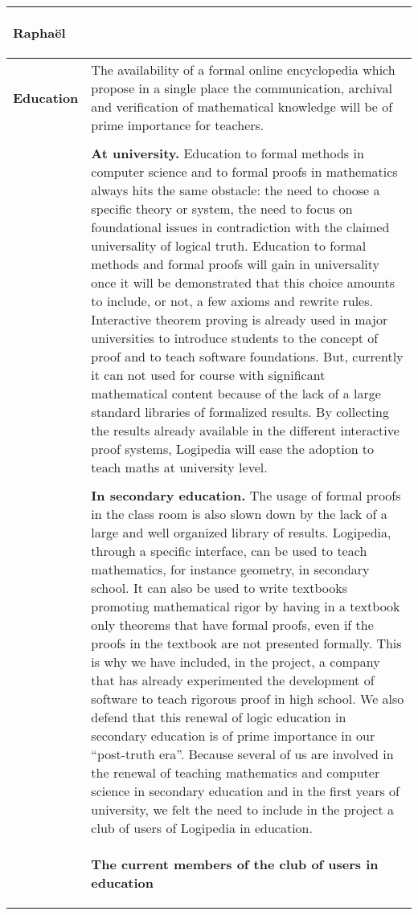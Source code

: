 \begin{longtable}{|p{}|p{}|}
\begin{framed}
{\color{red} Raphaël}  
\end{framed}\\
\hline
{\bf Education}
&
The availability of a formal online encyclopedia which propose in a
single place the communication, archival and verification of
mathematical knowledge will be of prime importance for teachers.\\
&\\
&
{\bf At university.}
Education to formal methods in computer science and to formal proofs
in mathematics always hits the same obstacle: the need to choose a
specific theory or system, the need to focus on foundational issues in
contradiction with the claimed universality of logical truth.
Education to formal methods and formal proofs will gain in
universality once it will be demonstrated that this choice amounts to
include, or not, a few axioms and rewrite rules.  
Interactive theorem proving is already used in major universities to 
introduce students to the concept of proof and to teach software foundations.
But, currently it can not used for course with significant mathematical content 
because of the lack of a large standard libraries of formalized results.
By collecting the results already available in the different interactive proof systems,
Logipedia will ease the adoption to teach maths at university level.\\
&\\
&
{\bf In secondary education.}
The usage of formal proofs in the class room is also slown down by the
lack of a large and well organized library of results.  Logipedia,
through a specific interface, can be used to teach mathematics, for
instance geometry, in secondary school.  It can also be used to write
textbooks promoting mathematical rigor by having in a textbook only
theorems that have formal proofs, even if the proofs in the textbook
are not presented formally. 
This is why we have included, in the project, a company that has 
already experimented the development of software to teach rigorous proof
in high school. 
We also defend that this renewal of logic education in secondary education
is of prime importance in our ``post-truth era''.
Because several of us are involved in the renewal of teaching
mathematics and computer science in secondary education and in the
first years of university, we felt the need to include in the project
a club of users of Logipedia in education.\\
&
\begin{framed}
\begin{center}
{\bf \Large The current members of the club of users in education}
\end{center}


\end{framed}
\end{longtable}
